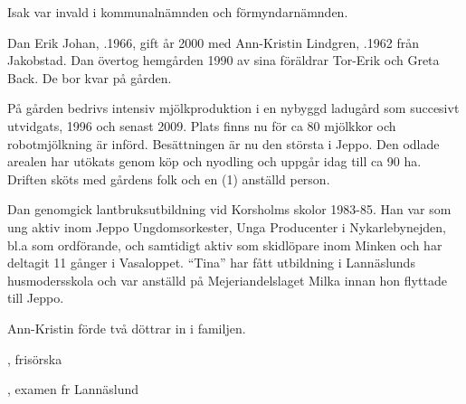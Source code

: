 Isak var invald i kommunalnämnden och förmyndarnämnden.
\begin{jhchildren}
  \item {}
  \item {}
  \item {}
  \item {}
  \item {}
  \item {}
  \item {}
\end{jhchildren}






Dan Erik Johan, .1966, gift år 2000 med Ann-Kristin Lindgren, .1962 från Jakobstad. Dan övertog hemgården 1990 av sina  föräldrar Tor-Erik och Greta Back. De bor kvar på gården.

På gården bedrivs intensiv mjölkproduktion i en nybyggd ladugård som succesivt utvidgats, 1996 och senast 2009. Plats finns nu för ca 80 mjölkkor och robotmjölkning är införd. Besättningen är nu den största i Jeppo. Den odlade arealen har utökats genom köp och nyodling och uppgår idag till ca 90 ha. Driften sköts med gårdens folk och en (1) anställd person.

Dan genomgick lantbruksutbildning vid Korsholms skolor 1983-85. Han var som ung aktiv inom Jeppo Ungdomsorkester, Unga Producenter i Nykarlebynejden, bl.a som ordförande, och samtidigt aktiv som skidlöpare inom Minken och har deltagit 11 gånger i Vasaloppet. ``Tina'' har fått utbildning i Lannäslunds husmodersskola och var anställd på Mejeriandelslaget Milka innan hon flyttade till Jeppo.

Ann-Kristin förde två döttrar in i familjen.
\begin{jhchildren}
  \item {}, frisörska
  \item {}, examen fr Lannäslund
\end{jhchildren}


